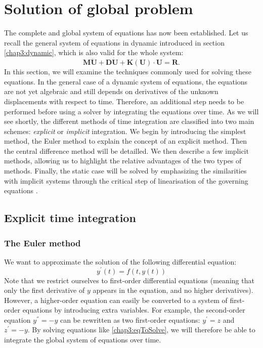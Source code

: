 


\section{Solution of global problem}
The complete and global system of equations has now been established. Let us recall the general system of equations in dynamic introduced in section \ref{chap3:dynamic}, which is also valid for the whole system: 
\begin{equation}
\label{chap3:dynamic2}
\mathbf{M} \mathbf{\ddot U} + \mathbf{D} \mathbf{ \dot U} + \mathbf{K}(\mathbf{U}) \cdot \mathbf{U} = \mathbf{R}.
\end{equation}	
In this section, we will examine the techniques commonly used for solving these equations. In the general case of a dynamic system of equations, the equations are not yet algebraic and still depends on derivatives of the unknown displacements with respect to time. Therefore, an additional step needs to be performed before using a solver by integrating the equations over time. As we will see shortly, the different methods of time integration are classified into two main schemes: \emph{explicit} or \emph{implicit} integration. We begin by introducing the simplest method, the Euler method to explain the concept of an explicit method. Then the central difference method will be detailled. We then describe a few implicit methods, allowing us to highlight the relative advantages of the two types of methods. Finally, the static case will be solved by emphasizing the similarities with implicit systems through the critical step of linearisation of the governing equations \citep{Belytschko00}.

	\subsection{Explicit time integration}

		\subsubsection*{The Euler method}	
We want to approximate the solution of the following differential equation:
\begin{equation}
\label{chap3:eqToSolve}
y^{'}(t) = f(t, y(t))
\end{equation}
Note that we restrict ourselves to first-order differential equations (meaning that only the first derivative of $y$ appears in the equation, and no higher derivatives). However, a higher-order equation can easily be converted to a system of first-order equations by introducing extra variables. For example, the second-order equation $y^{''} = -y$ can be rewritten as two first-order equations: $y^{'} = z$ and $z^{'} = -y$. By solving equations like \eqref{chap3:eqToSolve}, we will therefore be able to integrate the global system of equations over time. 

